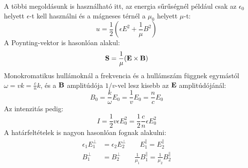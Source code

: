 \documentclass[a4paper,12pt]{article}
\begin{document}
A többi megoldásunk is használható itt, az energia sűrűségnél például csak az $\epsilon_0$ helyett $\epsilon$-t kell használni és a mágneses térnél a $\mu_0$ helyett $\mu$-t:
\begin{equation}
    u = \frac{1}{2} \left( \epsilon E^2 + \frac{1}{\mu} B^2 \right)
\end{equation}
A Poynting-vektor is hasonlóan alakul:
\begin{equation}
    \bold{S} = \frac{1}{\mu} (\bold{E} \times \bold{B})
\end{equation}
Monokromatikus hullámoknál a frekvencia és a hullámszám függnek egymástól $\omega = vk = \frac{c}{n} k$, és a $\bold{B}$ amplitúdója $1/v$-vel lesz kisebb az $\bold{E}$ amplitúdójánál:
\begin{equation}
    B_0 = \frac{k}{\omega} E_0 = \frac{1}{v} E_0 = \frac{n}{c} E_0
\end{equation}
Az intenzitás pedig:
\begin{equation}
    I = \frac{1}{2} v \epsilon E_0^2 = \frac{1}{2} \frac{c}{n} \epsilon E_0^2
\end{equation}
A határfeltételek is nagyon hasonlóan fognak alakulni:
\begin{equation}
    \begin{aligned}
        \epsilon_1 E_1^\perp &= \epsilon_2 E_2^\perp \qquad E_{1}^\parallel = E_{2}^\parallel \\
        B_1^\perp &= B_2^\perp \qquad \frac{1}{\mu_1} B_{1}^\parallel = \frac{1}{\mu_2} B_{2}^\parallel
    \end{aligned}
\end{equation}
\end{document}
